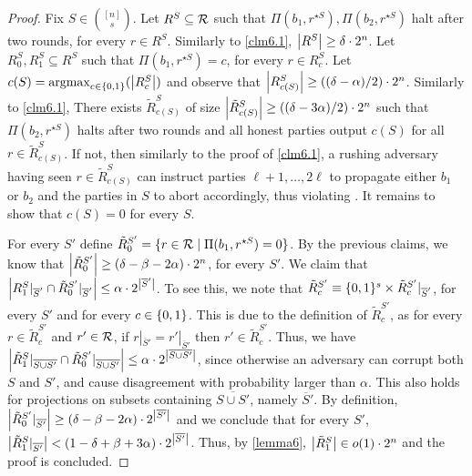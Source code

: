 \begin{proof}
	Fix $S \in \binom{[n]}{s}$. Let $R^S \subseteq \mathcal{R}$ such that $\Pi(b_1,r^{\star S}), \Pi(b_2,r^{\star S})$ halt after two rounds, for every $r \in R^S$. Similarly to \cref{clm6.1}, $\left\lvert R^S \right\rvert \geq \delta \cdot 2^{n}$. Let $R^S_0,R^S_1 \subseteq R^S$ such that $\Pi(b_1,r^{\star S}) = c$, for every $r \in R^S_c$.  Let $c(S) = \operatorname*{argmax}_{c \in \{0,1\}}(\left|R^S_c\right|)$ and observe that $\left\lvert R^S_{c(S)} \right\rvert \geq ((\delta-\alpha)/2) \cdot 2^{n}$. Similarly to \cref{clm6.1}, There exists $\tilde{R}^S_{c(S)}$ of size $\left|\tilde{R}^S_{c(S)}\right| \geq ((\delta-3\alpha)/2) \cdot 2^{n}$ such that $\Pi(b_2,r^{\star S})$ halts after two rounds and all honest parties output $c(S)$ for all $r \in \tilde{R}^S_{c(S)}$. If not, then similarly to the proof of \cref{clm6.1}, a rushing adversary having seen $r \in \tilde{R}_{c(S)}^S$ can instruct parties $\ell+1, \dots ,2\ell$ to propagate either $b_1$ or $b_2$ and the parties in $S$ to abort accordingly, thus violating \agr. It remains to show that $c(S) = 0$ for every $S$. 
	
	For every $S'$ define $\tilde{R}^{S'}_0 = \{r \in \mathcal{R} \mid \Pi(b_1,r^{\star S}) = 0\}$. By the previous claims, we know that $\left|\tilde{R}^{S'}_0\right| \geq (\delta-\beta-2\alpha) \cdot 2^{n}$, for every  $S'$. We claim that ${\left|R^S_1|_{\overline{S}'} \cap \tilde{R}^{S'}_0|_{\overline{S}'}\right| \leq \alpha \cdot 2^{\left|\overline{S}'\right|}}$. To see this, we note that ${\tilde{R}^{S'}_c \equiv \{0,1\}^{s} \times \tilde{R}^{S'}_c|_{\overline{S}'}}$, for every $S'$ and for every $c \in \{0,1\}$. This is due to the definition of $\tilde{R}^{S'}_c$, as for every $r \in \tilde{R}^{S'}_c$ and $r' \in \mathcal{R}$, if $r|_{\overline{S}'} = r'|_{\overline{S}'}$ then $r' \in \tilde{R}^{S'}_c$. Thus, we have ${\left|\tilde{R}^S_1|_{\overline{S \cup S'}} \cap \tilde{R}^{S'}_0|_{\overline{S \cup S'}}\right| \leq \alpha \cdot 2^{\left|\overline{S \cup S'}\right|}}$, since otherwise an adversary can corrupt both $S$ and $S'$, and cause disagreement with probability larger than $\alpha$. This also holds for projections on subsets containing $\overline{S \cup S'}$, namely $\overline{S}'$. By definition, $\left|\tilde{R}^{S'}_0|_{\overline{S'}}\right| \geq (\delta-\beta-2\alpha) \cdot 2^{\left|\overline{S'}\right|}$ and we conclude that for every $S'$, $\left|\tilde{R}^S_1|_{\overline{S'}}\right| < (1-\delta +\beta +3\alpha) \cdot 2^{\left|\overline{S'}\right|}$. Thus, by \cref{lemma6}, $\left|\tilde{R}^S_1\right| \in o(1) \cdot 2^{n}$ and the proof is concluded. 
\end{proof}

